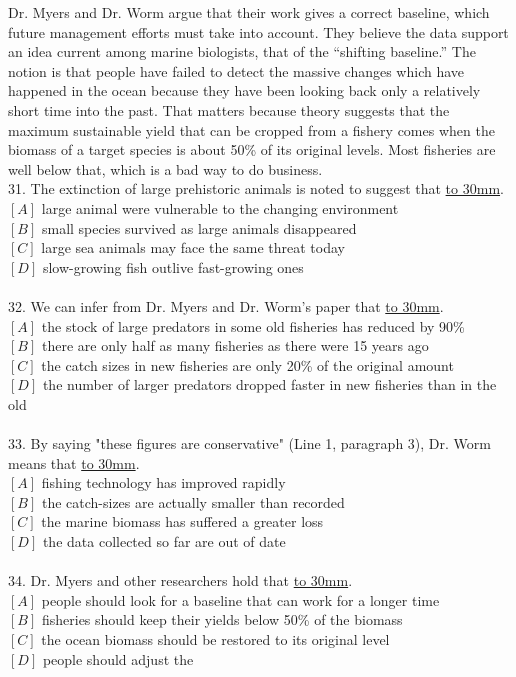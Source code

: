 \documentclass[a4paper]{article}
\begin{document}
\par
Dr. Myers and Dr. Worm argue that their work gives a correct baseline, which future management efforts must take into account. They believe the data support an idea current among marine biologists, that of the “shifting baseline.” The notion is that people have failed to detect the massive changes which have happened in the ocean because they have been looking back only a relatively short time into the past. That matters because theory suggests that the maximum sustainable yield that can be cropped from a fishery comes when the biomass of a target species is about 50\% of its original levels. Most fisheries are well below that, which is a bad way to do business.
\\31.	The extinction of large prehistoric animals is noted to suggest that \underline{\hbox to 30mm{}}.\\$[A]$ large animal were vulnerable to the changing environment\\$[B]$ small species survived as large animals disappeared\\$[C]$ large sea animals may face the same threat today\\$[D]$ slow-growing fish outlive fast-growing ones\\\\32.	We can infer from Dr. Myers and Dr. Worm’s paper that \underline{\hbox to 30mm{}}.\\$[A]$ the stock of large predators in some old fisheries has reduced by 90\%\\$[B]$ there are only half as many fisheries as there were 15 years ago\\$[C]$ the catch sizes in new fisheries are only 20\% of the original amount\\$[D]$ the number of larger predators dropped faster in new fisheries than in the old\\\\33.	By saying "these figures are conservative" (Line 1, paragraph 3), Dr. Worm means that \underline{\hbox to 30mm{}}.\\$[A]$ fishing technology has improved rapidly\\$[B]$ the catch-sizes are actually smaller than recorded\\$[C]$ the marine biomass has suffered a greater loss\\$[D]$ the data collected so far are out of date\\\\34.	Dr. Myers and other researchers hold that \underline{\hbox to 30mm{}}.\\$[A]$ people should look for a baseline that can work for a longer time\\$[B]$ fisheries should keep their yields below 50\% of the biomass\\$[C]$ the ocean biomass should be restored to its original level\\$[D]$ people should adjust the 
\end{document}

